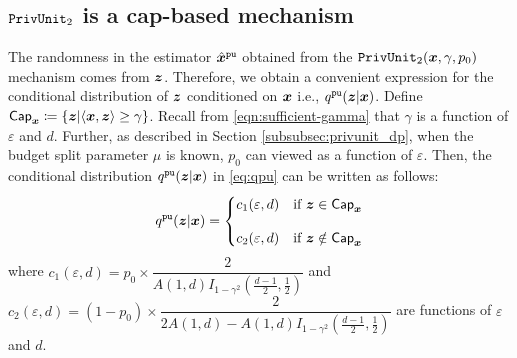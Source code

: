 
\subsection{\texorpdfstring{$\texttt{PrivUnit}_2$}{PrivUnit} is a cap-based mechanism}
The randomness in the estimator $\hat{{\boldsymbol{x}}}^{\texttt{pu}}$ obtained from the $\texttt{PrivUnit}_2({\boldsymbol{x}},\gamma, p_0)$ mechanism comes from ${\boldsymbol{z}}$. Therefore, we obtain a convenient expression for the conditional distribution of ${\boldsymbol{z}}$ conditioned on ${\boldsymbol{x}}$ i.e., $q^{\texttt{pu}}({\boldsymbol{z}} | {\boldsymbol{x}})$. Define $\mathsf{Cap}_{{\boldsymbol{x}}} \coloneqq \{{\boldsymbol{z}} | \langle {\boldsymbol{x}}, {\boldsymbol{z}} \rangle \geq \gamma\}$. Recall from \eqref{eqn:sufficient-gamma} that $\gamma$ is a function of $\varepsilon$ and $d$. 
Further, as described in Section \ref{subsubsec:privunit_dp}, when the budget split parameter $\mu$ is known, $p_0$ can viewed as a function of $\varepsilon$. Then, the conditional distribution $q^{\texttt{pu}}({\boldsymbol{z}} | {\boldsymbol{x}})$ in \eqref{eq:qpu} can be written as follows:
\begin{align}
    q^{\texttt{pu}}({\boldsymbol{z}} | {\boldsymbol{x}}) = 
    \begin{cases}
      c_1(\varepsilon, d) & \text{if}\ {\boldsymbol{z}} \in \mathsf{Cap}_{{\boldsymbol{x}}}
      \\[10pt]
      c_2(\varepsilon, d) & \text{if}\ {\boldsymbol{z}} \notin \mathsf{Cap}_{{\boldsymbol{x}}}
    \end{cases} \label{eq:privunit_density}
\end{align}
where $c_1(\varepsilon, d) = p_0 \times \dfrac{2}{A(1,d)I_{1-\gamma^2}(\frac{d-1}{2},\frac{1}{2})}$ and $c_2(\varepsilon, d) = (1-p_0) \times \dfrac{2}{2A(1,d)- A(1,d)I_{1-\gamma^2}(\frac{d-1}{2},\frac{1}{2})}$ are functions of $\varepsilon$ and $d$. 

